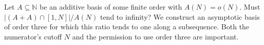 Let $A\subseteq\mathbb N$ be an additive basis of some finite order with $A(N)=o(N)$. Must $|(A+A)\cap[1,N]|/A(N)$ tend to infinity? We construct an asymptotic basis of order three for which this ratio tends to one along a subsequence. Both the numerator's cutoff $N$ and the permission to use order three are important.
